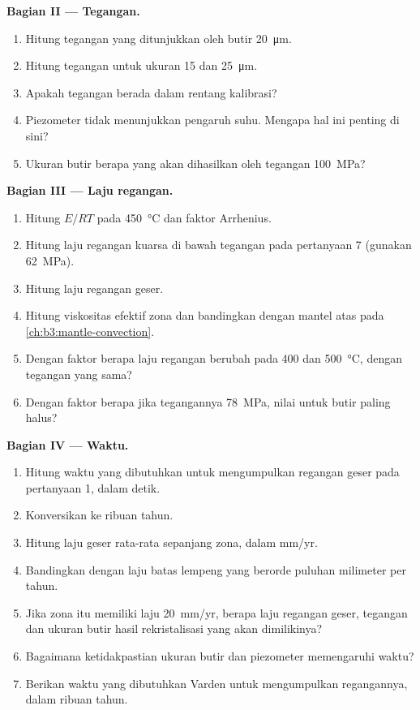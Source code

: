 \begin{problem}
\medskip\noindent\textbf{Bagian II --- Tegangan.}
\begin{enumerate}[resume]
  \item Hitung tegangan yang ditunjukkan oleh butir \qty{20}{\micro m}.
  \item Hitung tegangan untuk ukuran 15 dan \qty{25}{\micro m}.
  \item Apakah tegangan berada dalam rentang kalibrasi?
  \item Piezometer tidak menunjukkan pengaruh suhu. Mengapa hal ini penting
        di sini?
  \item Ukuran butir berapa yang akan dihasilkan oleh tegangan \qty{100}{MPa}?
\end{enumerate}

\medskip\noindent\textbf{Bagian III --- Laju regangan.}
\begin{enumerate}[resume]
  \item Hitung $E/RT$ pada \qty{450}{\celsius} dan faktor Arrhenius.
  \item Hitung laju regangan kuarsa di bawah tegangan pada pertanyaan 7
        (gunakan \qty{62}{MPa}).
  \item Hitung laju regangan geser.
  \item Hitung viskositas efektif zona dan bandingkan dengan
        mantel atas pada \cref{ch:b3:mantle-convection}.
  \item Dengan faktor berapa laju regangan berubah pada 400 dan
        \qty{500}{\celsius}, dengan tegangan yang sama?
  \item Dengan faktor berapa jika tegangannya \qty{78}{MPa}, nilai untuk
        butir paling halus?
\end{enumerate}

\medskip\noindent\textbf{Bagian IV --- Waktu.}
\begin{enumerate}[resume]
  \item Hitung waktu yang dibutuhkan untuk mengumpulkan regangan geser pada pertanyaan 1,
        dalam detik.
  \item Konversikan ke ribuan tahun.
  \item Hitung laju geser rata-rata sepanjang zona, dalam \unit{mm/yr}.
  \item Bandingkan dengan laju batas lempeng yang berorde puluhan milimeter per tahun.
  \item Jika zona itu memiliki laju \qty{20}{mm/yr}, berapa laju regangan geser, tegangan
        dan ukuran butir hasil rekristalisasi yang akan dimilikinya?
  \item Bagaimana ketidakpastian ukuran butir dan 
        piezometer memengaruhi waktu?
  \item Berikan waktu yang dibutuhkan  Varden untuk mengumpulkan regangannya, dalam
        ribuan tahun.
\end{enumerate}
\end{problem}
